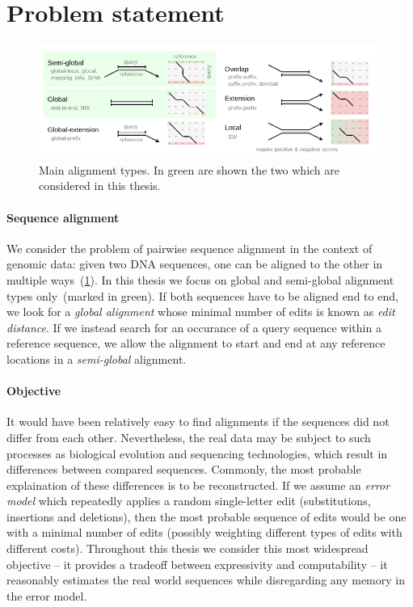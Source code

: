 \section*{Problem statement}

\begin{figure}[t]  %
    \includegraphics[width=\textwidth]{alignment-types-thesis.pdf}
	\caption[Main alignment types]{Main alignment types. In green are shown the two which are considered in this thesis.}
    \label{fig:alignment-types}
\end{figure}

\paragraph{Sequence alignment}
We consider the problem of pairwise sequence alignment in the context of genomic
data: given two DNA sequences, one can be aligned to the other in multiple
ways~(\cref{fig:alignment-types}). In this thesis we focus on global and
semi-global alignment types only~(marked in green). If both sequences have to be
aligned end to end, we look for a \emph{global alignment} whose minimal number
of edits is known as \emph{edit distance}. If we instead search for an occurance
of a query sequence within a reference sequence, we allow the alignment to start
and end at any reference locations in a \emph{semi-global} alignment.

\paragraph{Objective}
It would have been relatively easy to find alignments if the sequences did not
differ from each other. Nevertheless, the real data may be subject to such
processes as biological evolution and sequencing technologies, which result in
differences between compared sequences. Commonly, the most probable explaination
of these differences is to be reconstructed. If we assume an \emph{error model}
which repeatedly applies a random single-letter edit (substitutions, insertions
and deletions), then the most probable sequence of edits would be one with a
minimal number of edits (possibly weighting different types of edits with
different costs). Throughout this thesis we consider this most widespread
objective -- it provides a tradeoff between expressivity and computability -- it
reasonably estimates the real world sequences while disregarding any memory in
the error model. 

